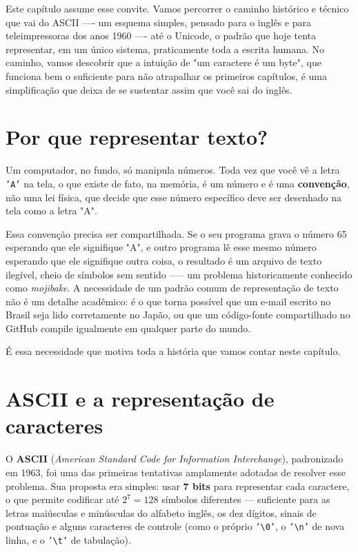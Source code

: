 \documentclass[12pt,a4paper,oneside]{extreport}
\begin{document}
Este capítulo assume esse convite. Vamos percorrer o caminho histórico e técnico que vai do ASCII —- um esquema simples, pensado para o inglês e para teleimpressoras dos anos 1960 —- até o Unicode, o padrão que hoje tenta representar, em um único sistema, praticamente toda a escrita humana. No caminho, vamos descobrir que a intuição de "um caractere é um byte", que funciona bem o suficiente para não atrapalhar os primeiros capítulos, é uma simplificação que deixa de se sustentar assim que você sai do inglês.

\section*{Por que representar texto?}

Um computador, no fundo, só manipula números. Toda vez que você vê a letra \texttt{'A'} na tela, o que existe de fato, na memória, é um número e é uma \textbf{convenção}, não uma lei física, que decide que esse número específico deve ser desenhado na tela como a letra "A".

Essa convenção precisa ser compartilhada. Se o seu programa grava o número 65 esperando que ele signifique "A", e outro programa lê esse mesmo número esperando que ele signifique outra coisa, o resultado é um arquivo de texto ilegível, cheio de símbolos sem sentido —-- um problema historicamente conhecido como \textit{mojibake}. A necessidade de um padrão comum de representação de texto não é um detalhe acadêmico: é o que torna possível que um e-mail escrito no Brasil seja lido corretamente no Japão, ou que um código-fonte compartilhado no GitHub compile igualmente em qualquer parte do mundo.

É essa necessidade que motiva toda a história que vamos contar neste capítulo.

\section*{ASCII e a representação de caracteres}

O \textbf{ASCII} (\textit{American Standard Code for Information Interchange}), padronizado em 1963, foi uma das primeiras tentativas amplamente adotadas de resolver esse problema. Sua proposta era simples: usar \textbf{7 bits} para representar cada caractere, o que permite codificar até $2^7 = 128$ símbolos diferentes — suficiente para as letras maiúsculas e minúsculas do alfabeto inglês, os dez dígitos, sinais de pontuação e alguns caracteres de controle (como o próprio \texttt{'\textbackslash 0'}, o \texttt{'\textbackslash n'} de nova linha, e o \texttt{'\textbackslash t'} de tabulação).
\end{document}
